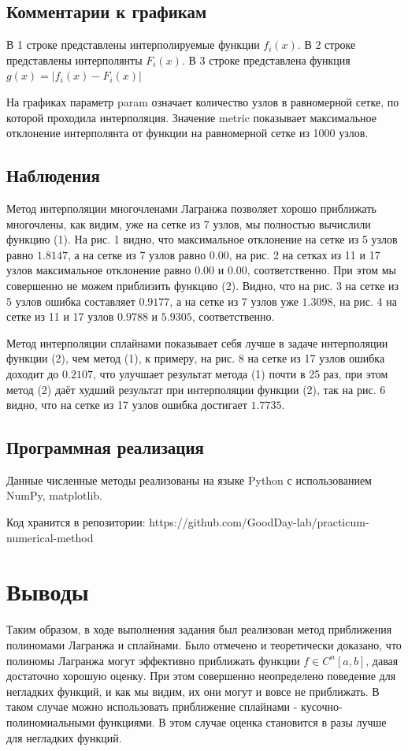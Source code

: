 \documentclass{article}
\begin{document}
\subsection{Комментарии к графикам}
В 1 строке представлены интерполируемые функции \(f_i(x)\).
В 2 строке представлены интерполянты \(F_i(x)\).
В 3 строке представлена функция \(g(x) = |f_i(x) - F_i(x)|\)

На графиках параметр {\large param} означает количество узлов в равномерной сетке, по которой проходила интерполяция. Значение {\large metric} показывает максимальное отклонение  интерполянта от функции на равномерной сетке из 1000 узлов.

\subsection{Наблюдения}
Метод интерполяции многочленами Лагранжа позволяет хорошо приближать многочлены, как видим, уже на сетке из 7 узлов, мы полностью вычислили функцию (1). На рис. 1 видно, что максимальное отклонение на сетке из 5 узлов равно \(1.8147\), а на сетке из 7 узлов равно \(0.00\), на рис. 2 на сетках из 11 и 17 узлов максимальное отклонение равно \(0.00\) и \(0.00\), соответственно.
При этом мы совершенно не можем приблизить функцию (2).
Видно, что на рис. 3 на сетке из 5 узлов ошибка составляет \(0.9177\), а на сетке из 7 узлов уже \(1.3098\), на рис. 4 на сетке из 11 и 17 узлов \(0.9788\) и \(5.9305\), соответственно.

Метод интерполяции сплайнами показывает себя лучше в задаче интерполяции функции (2), чем метод (1), к примеру, на рис. 8 на сетке из 17 узлов ошибка доходит до \(0.2107\), что улучшает результат метода (1) почти в 25 раз, при этом метод (2) даёт худший результат при интерполяции функции (2), так на рис. 6 видно, что на сетке из 17 узлов ошибка достигает \(1.7735\).

\subsection{Программная реализация}
Данные численные методы реализованы на языке Python с использованием NumPy, matplotlib.

Код хранится в репозитории: 
https://github.com/GoodDay-lab/practicum-numerical-method

\section{Выводы}
Таким образом, в ходе выполнения задания был реализован метод приближения полиномами Лагранжа и сплайнами. Было отмечено и теоретически доказано, что полиномы Лагранжа могут эффективно приближать функции \(f \in C^n[a,b]\), давая достаточно хорошую оценку. При этом совершенно неопределено поведение для негладких функций, и как мы видим, их они могут и вовсе не приближать. В таком случае можно использовать приближение сплайнами - кусочно-полиномиальными функциями. В этом случае оценка становится в разы лучше для негладких функций.
\end{document}
